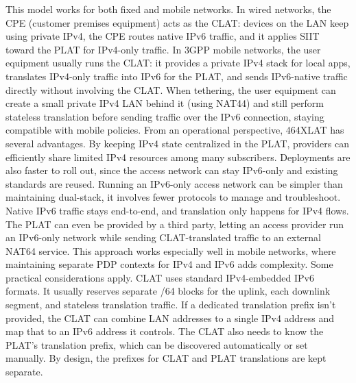 This model works for both fixed and mobile networks. In wired networks, the CPE (customer premises equipment) acts as the CLAT: devices on the LAN keep using private IPv4, the CPE routes native IPv6 traffic, and it applies SIIT toward the PLAT for IPv4-only traffic. In 3GPP mobile networks, the user equipment usually runs the CLAT: it provides a private IPv4 stack for local apps, translates IPv4-only traffic into IPv6 for the PLAT, and sends IPv6-native traffic directly without involving the CLAT. When tethering, the user equipment can create a small private IPv4 LAN behind it (using NAT44) and still perform stateless translation before sending traffic over the IPv6 connection, staying compatible with mobile policies\cite{rfc6877}.
From an operational perspective, 464XLAT has several advantages. By keeping IPv4 state centralized in the PLAT, providers can efficiently share limited IPv4 resources among many subscribers. Deployments are also faster to roll out, since the access network can stay IPv6-only and existing standards are reused. Running an IPv6-only access network can be simpler than maintaining dual-stack, it involves fewer protocols to manage and troubleshoot. Native IPv6 traffic stays end-to-end, and translation only happens for IPv4 flows. The PLAT can even be provided by a third party, letting an access provider run an IPv6-only network while sending CLAT-translated traffic to an external NAT64 service. This approach works especially well in mobile networks, where maintaining separate PDP contexts for IPv4 and IPv6 adds complexity\cite{rfc6877}.
Some practical considerations apply. CLAT uses standard IPv4-embedded IPv6 formats. It usually reserves separate /64 blocks for the uplink, each downlink segment, and stateless translation traffic. If a dedicated translation prefix isn’t provided, the CLAT can combine LAN addresses to a single IPv4 address and map that to an IPv6 address it controls. The CLAT also needs to know the PLAT’s translation prefix, which can be discovered automatically or set manually. By design, the prefixes for CLAT and PLAT translations are kept separate\cite{rfc6877}.



